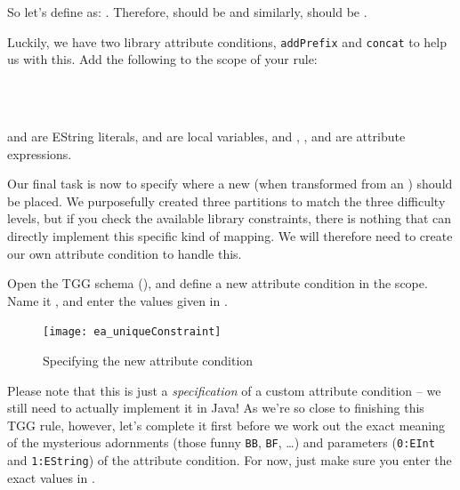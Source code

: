 So let's define  as: . 
Therefore,  should be  and similarly,  should be . 

\begin{stepbystep}
\item Luckily, we have two library attribute conditions, \texttt{addPrefix} and \texttt{concat} to help us with this.
Add the following to the  scope of your rule:

\\  
\\

 and  are EString literals,  and
 are local variables, and , , and  are attribute expressions.

\item Our final task is now to specify where a new  (when transformed from an ) should be placed.  
We purposefully created three partitions to match the three difficulty levels, but if you check the available library constraints, there is nothing that can directly implement this specific kind of mapping. 
We will therefore need to create our own attribute condition to handle this.

\item Open the TGG schema (), and define a new attribute condition in the  scope. 
Name it , and enter the values given in .

\begin{figure}[htbp]
\begin{center}
  \texttt{[image: ea\_uniqueConstraint]}
  \caption{Specifying the new attribute condition }
  \label{ea:create_new_constraint}
\end{center}
\end{figure}
\FloatBarrier

\item Please note that this is just a \emph{specification} of a custom attribute condition -- we still need to actually implement it in Java! 
As we're so close to finishing this TGG rule, however, let's complete it first before we work out the exact meaning of the mysterious adornments (those funny \texttt{BB}, \texttt{BF}, \dots) and parameters (\texttt{0:EInt} and \texttt{1:EString}) of the attribute condition. 
For now, just make sure you enter the exact values in . 


\end{stepbystep}
